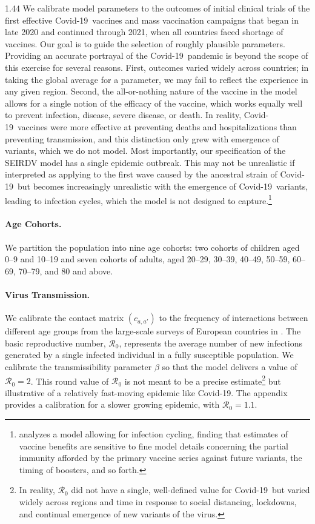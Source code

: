 \documentclass[12pt]{article}
\newcommand{\covid}{Covid-19}
\newcommand{\Rzero}{\mathcal{R}_0}
\begin{document}
\begin{spacing}{1.44}
We calibrate model parameters to the outcomes of initial clinical
trials of the first effective \covid\ vaccines and mass vaccination
campaigns that began in late 2020 and continued through 2021, when all
countries faced shortage of vaccines. Our goal is to guide the
selection of roughly plausible parameters. Providing an accurate
portrayal of the \covid\ pandemic is beyond the scope of this exercise
for several reasons. First, outcomes varied widely across countries;
in taking the global average for a parameter, we may fail to reflect
the experience in any given region. Second, the all-or-nothing nature
of the vaccine in the model allows for a single notion of the efficacy
of the vaccine, which works equally well to prevent infection,
disease, severe disease, or death. In reality, \covid\ vaccines were
more effective at preventing deaths and hospitalizations than
preventing transmission, and this distinction only grew with emergence
of variants, which we do not model. Most importantly, our
specification of the SEIRDV model has a single epidemic outbreak. This
may not be unrealistic if interpreted as applying to the first wave
caused by the ancestral strain of \covid\ but becomes increasingly
unrealistic with the emergence of \covid\ variants, leading to
infection cycles, which the model is not designed to
capture.\footnote{\citet{Wiecek2023} analyzes a model allowing for
infection cycling, finding that estimates of vaccine benefits are
sensitive to fine model details concerning the partial immunity
afforded by the primary vaccine series against future variants, the
timing of boosters, and so forth.}

\paragraph{Age Cohorts.}

We partition the population into nine age cohorts: two cohorts of
children aged 0--9 and 10--19 and seven cohorts of adults, aged 20--29,
30--39, 40--49, 50--59, 60--69, 70--79, and 80 and above.

\paragraph{Virus Transmission.}

We calibrate the contact matrix $(c_{a,a'})$ to the frequency of
interactions between different age groups from the large-scale surveys
of European countries in \citet{Mossong2008}.  The basic reproductive
number, $\Rzero$, represents the average number of new infections
generated by a single infected individual in a fully susceptible
population. We calibrate the transmissibility parameter $\beta$ so
that the model delivers a value of $\Rzero = 2$. This round value of
$\Rzero$ is not meant to be a precise estimate\footnote{In reality,
$\Rzero$ did not have a single, well-defined value for \covid\ but
varied widely across regions and time in response to social
distancing, lockdowns, and continual emergence of new variants of the
virus.} but illustrative of a relatively fast-moving epidemic like
\covid. The appendix provides a calibration for a slower growing
epidemic, with $\Rzero = 1.1$.


\end{spacing}
\end{document}
